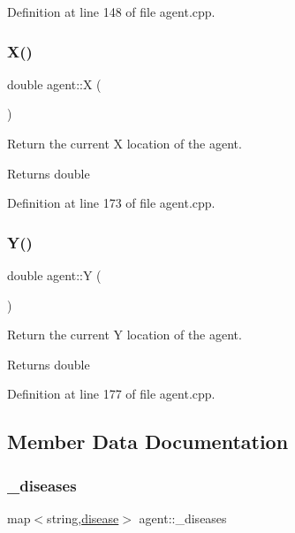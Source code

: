 Definition at line 148 of file agent.\+cpp.

\mbox{\label{classagent_a312bd1aeb3c660f43bb3bf5a8f0764e7}} 
\subsubsection{\texorpdfstring{X()}{X()}}
{\footnotesize\ttfamily double agent\+::X (\begin{DoxyParamCaption}{ }\end{DoxyParamCaption})}



Return the current X location of the agent. 

\begin{DoxyReturn}{Returns}
double 
\end{DoxyReturn}


Definition at line 173 of file agent.\+cpp.

\mbox{\label{classagent_a56b8ea7b9138c5e4b92530d454e247ad}} 
\subsubsection{\texorpdfstring{Y()}{Y()}}
{\footnotesize\ttfamily double agent\+::Y (\begin{DoxyParamCaption}{ }\end{DoxyParamCaption})}



Return the current Y location of the agent. 

\begin{DoxyReturn}{Returns}
double 
\end{DoxyReturn}


Definition at line 177 of file agent.\+cpp.



\subsection{Member Data Documentation}
\mbox{\label{classagent_a2352342e95bc77041c07c0dafdfb7cd2}} 
\subsubsection{\texorpdfstring{\+\_\+diseases}{\_diseases}}
{\footnotesize\ttfamily map$<$string,\mbox{\hyperlink{classdisease}{disease}}$>$ agent\+::\+\_\+diseases}



